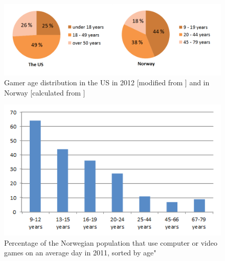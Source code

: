 \begin{figure}
\label{fig:GamersUSNorway}
\begin{center}
\includegraphics[scale=0.5]{gamersusnorway}
\caption[Gamer age distribution]{Gamer age distribution in the US in 2012 [modified from \cite{statistics2012}] and in Norway [calculated from \cite{ssb2011} \cite{folketall2012}]}
\end{center}
\end{figure}

\begin{figure}
\label{fig:GameStatisticsNorway}
\begin{center}
\includegraphics[scale=0.9]{gamestatisticsnorway}
\caption[Use of computer or video games, Norway, 2011]{Percentage of the Norwegian population that use computer or video games on an average day in 2011, sorted by age" \cite{ssb2011}}
\end{center}
\end{figure}
       
